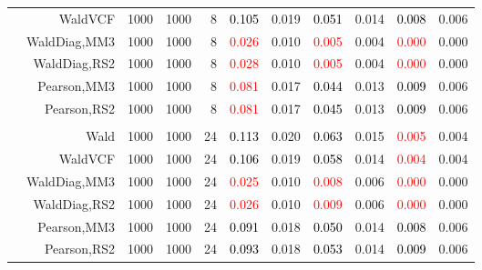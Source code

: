 \documentclass[
]{article}
\begin{document}
\begin{table}[H]
{\begin{tabular}[t]{lrrrrrrrlrr}
\hspace{1em} & WaldVCF & 1000 & 1000 & 8 & \textcolor{black}{0.105} & 0.019 & \textcolor{black}{0.051} & 0.014 & \textcolor{black}{0.008} & 0.006\\

\hspace{1em} & WaldDiag,MM3 & 1000 & 1000 & 8 & \textcolor{red}{0.026} & 0.010 & \textcolor{red}{0.005} & 0.004 & \textcolor{red}{0.000} & 0.000\\

\hspace{1em} & WaldDiag,RS2 & 1000 & 1000 & 8 & \textcolor{red}{0.028} & 0.010 & \textcolor{red}{0.005} & 0.004 & \textcolor{red}{0.000} & 0.000\\

\hspace{1em} & Pearson,MM3 & 1000 & 1000 & 8 & \textcolor{red}{0.081} & 0.017 & \textcolor{black}{0.044} & 0.013 & \textcolor{black}{0.009} & 0.006\\

\hspace{1em} & Pearson,RS2 & 1000 & 1000 & 8 & \textcolor{red}{0.081} & 0.017 & \textcolor{black}{0.045} & 0.013 & \textcolor{black}{0.009} & 0.006\\
\cmidrule{1-11}
\addlinespace[0.3em]
\multicolumn{11}{l}{\textbf{3F 15V}}\\
\hspace{1em} & Wald & 1000 & 1000 & 24 & \textcolor{black}{0.113} & 0.020 & \textcolor{black}{0.063} & 0.015 & \textcolor{red}{0.005} & 0.004\\

\hspace{1em} & WaldVCF & 1000 & 1000 & 24 & \textcolor{black}{0.106} & 0.019 & \textcolor{black}{0.058} & 0.014 & \textcolor{red}{0.004} & 0.004\\

\hspace{1em} & WaldDiag,MM3 & 1000 & 1000 & 24 & \textcolor{red}{0.025} & 0.010 & \textcolor{red}{0.008} & 0.006 & \textcolor{red}{0.000} & 0.000\\

\hspace{1em} & WaldDiag,RS2 & 1000 & 1000 & 24 & \textcolor{red}{0.026} & 0.010 & \textcolor{red}{0.009} & 0.006 & \textcolor{red}{0.000} & 0.000\\

\hspace{1em} & Pearson,MM3 & 1000 & 1000 & 24 & \textcolor{black}{0.091} & 0.018 & \textcolor{black}{0.050} & 0.014 & \textcolor{black}{0.008} & 0.006\\

\hspace{1em} & Pearson,RS2 & 1000 & 1000 & 24 & \textcolor{black}{0.093} & 0.018 & \textcolor{black}{0.053} & 0.014 & \textcolor{black}{0.009} & 0.006\\
\bottomrule
\end{tabular}}
\endgroup{}
\end{table}
\end{document}
